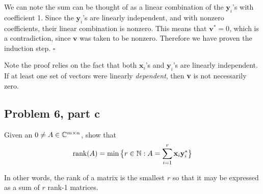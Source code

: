 \begin{solution}
    We can note the sum can be thought of as a linear combination of the $\textbf{y}_i$'s with coefficient 1. Since the $\textbf{y}_i$'s are linearly independent, and with nonzero coefficients, their linear combination is nonzero. This means that $\textbf{v}^* = 0$, which is a contradiction, since $\textbf{v}$ was taken to be nonzero. Therefore we have proven the induction step. $\square$ 

    Note the proof relies on the fact that both $\textbf{x}_i$'s and $\textbf{y}_i$'s are linearly independent. If at least one set of vectors were linearly \textit{dependent}, then \textbf{v} is not necessarily zero. 
\end{solution}

\newpage
\subsection{Problem 6, part c}
Given an $0 \neq A \in \mathbb{C}^{m\times n}$, show that 
\[
\text{rank}(A) = \min \big\{ r \in \mathbb{N} : A = \sum_{i = 1}^r \textbf{x}_i\textbf{y}_i^*\big\}
\]

In other words, the rank of a matrix is the smallest $r$ so that it may be expressed as a sum of $r$ rank-1 matrices.

